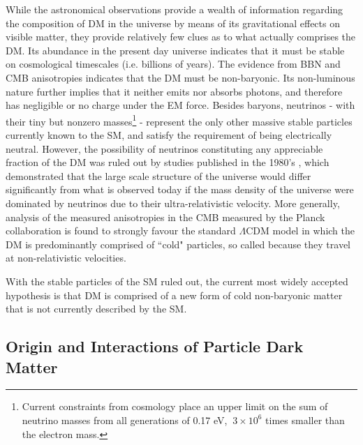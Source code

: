 While the astronomical observations provide a wealth of information regarding the composition of DM in the universe by means of its gravitational effects on visible matter, they provide relatively few clues as to what actually comprises the DM. Its abundance in the present day universe indicates that it must be stable on cosmological timescales (i.e. billions of years). The evidence from BBN and CMB anisotropies indicates that the DM must be non-baryonic. Its non-luminous nature further implies that it neither emits nor absorbs photons, and therefore has negligible or no charge under the EM force. Besides baryons, neutrinos - with their tiny but nonzero masses\footnote{Current constraints from cosmology place an upper limit on the sum of neutrino masses from all generations of 0.17 eV, \(~3\times10^6\) times smaller than the electron mass.} - represent the only other massive stable particles currently known to the SM, and satisfy the requirement of being electrically neutral. However, the possibility of neutrinos constituting any appreciable fraction of the DM was ruled out by studies published in the 1980's \cite{neutrino_dm}, which demonstrated that the large scale structure of the universe would differ significantly from what is observed today if the mass density of the universe were dominated by neutrinos due to their ultra-relativistic velocity. More generally, analysis of the measured anisotropies in the CMB measured by the Planck collaboration \cite{Planck_2020} is found to strongly favour the standard \(\Lambda\)CDM model in which the DM is predominantly comprised of ``cold" particles, so called because they travel at non-relativistic velocities.

With the stable particles of the SM ruled out, the current most widely accepted hypothesis is that DM is comprised of a new form of cold non-baryonic matter that is not currently described by the SM.

\subsection{Origin and Interactions of Particle Dark Matter}
\label{sec:dm_origins}

